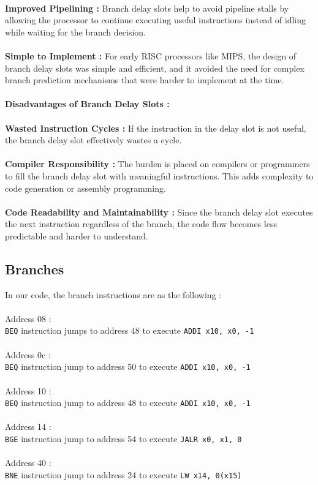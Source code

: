 \documentclass[a4paper,12pt]{article}
\begin{document}
\\
%
\textbf{Improved Pipelining :} Branch delay slots help to avoid pipeline stalls by allowing the processor to continue executing useful instructions instead of idling while waiting for the branch decision.\\
\\
%
\textbf{Simple to Implement :} For early RISC processors like MIPS, the design of branch delay slots was simple and efficient, and it avoided the need for complex branch prediction mechanisms that were harder to implement at the time.\\
\\
%
\textbf{Disadvantages of Branch Delay Slots :}\\
\\
%
\textbf{Wasted Instruction Cycles :} If the instruction in the delay slot is not useful, the branch delay slot effectively wastes a cycle.\\
\\
%
\textbf{Compiler Responsibility :} The burden is placed on compilers or programmers to fill the branch delay slot with meaningful instructions. This adds complexity to code generation or assembly programming.\\
\\
%
\textbf{Code Readability and Maintainability :} Since the branch delay slot executes the next instruction regardless of the branch, the code flow becomes less predictable and harder to understand.

\subsection{Branches}
In our code, the branch instructions are as the following :\\
\\
%
Address 08 :\\
\texttt{BEQ} instruction jumps to address 48 to execute \texttt{ADDI x10, x0, -1}\\
\\
%
Address 0c :\\
\texttt{BEQ} instruction jump to address 50 to execute \texttt{ADDI x10, x0, -1}\\
\\
%
Address 10 :\\
\texttt{BEQ} instruction jump to address 48 to execute \texttt{ADDI x10, x0, -1}\\
\\
%
Address 14 :\\
\texttt{BGE} instruction jump to address 54 to execute \texttt{JALR x0, x1, 0}\\
\\
%
Address 40 :\\
\texttt{BNE} instruction jump to address 24 to execute \texttt{LW x14, 0(x15)}
\end{document}
